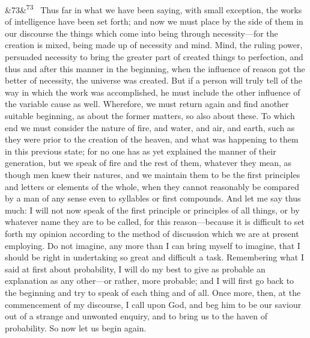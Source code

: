 \documentclass[12pt]{article}
\newcommand{\para}[1][]{\par\noindent\ifx&#1&\else\textsuperscript{\footnotesize #1}~\fi}
\begin{document}
\para[73] Thus far in what we have been saying, with small exception, the works of intelligence have been set forth; and now we must place by the side of them in our discourse the things which come into being through necessity---for the creation is mixed, being made up of necessity and mind. Mind, the ruling power, persuaded necessity to bring the greater part of created things to perfection, and thus and after this manner in the beginning, when the influence of reason got the better of necessity, the universe was created. But if a person will truly tell of the way in which the work was accomplished, he must include the other influence of the variable cause as well. Wherefore, we must return again and find another suitable beginning, as about the former matters, so also about these. To which end we must consider the nature of fire, and water, and air, and earth, such as they were prior to the creation of the heaven, and what was happening to them in this previous state; for no one has as yet explained the manner of their generation, but we speak of fire and the rest of them, whatever they mean, as though men knew their natures, and we maintain them to be the first principles and letters or elements of the whole, when they cannot reasonably be compared by a man of any sense even to syllables or first compounds. And let me say thus much: I will not now speak of the first principle or principles of all things, or by whatever name they are to be called, for this reason---because it is difficult to set forth my opinion according to the method of discussion which we are at present employing. Do not imagine, any more than I can bring myself to imagine, that I should be right in undertaking so great and difficult a task. Remembering what I said at first about probability, I will do my best to give as probable an explanation as any other---or rather, more probable; and I will first go back to the beginning and try to speak of each thing and of all. Once more, then, at the commencement of my discourse, I call upon God, and beg him to be our saviour out of a strange and unwonted enquiry, and to bring us to the haven of probability. So now let us begin again.
\end{document}
